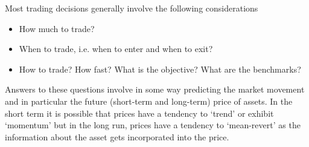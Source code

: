 Most trading decisions generally involve the following considerations
        \begin{itemize}
        \item How much to trade?
        \item When to trade, i.e. when to enter and when to exit?
        \item How to trade? How fast? What is the objective? What are the benchmarks?
        \end{itemize}
Answers to these questions involve in some way predicting the market movement and in particular the future (short-term and long-term) price of assets. In the short term it is possible that prices have a tendency to `trend' or exhibit `momentum' but in the long run, prices have a tendency to `mean-revert' as the information about the asset gets incorporated into the price. 


